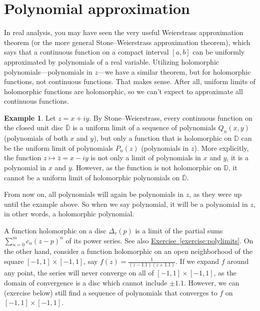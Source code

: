 \documentclass[12pt,openany]{book}
\newcommand{\D}{{\mathbb{D}}}
\theoremstyle{plain}
\theoremstyle{remark}
\theoremstyle{definition}
\theoremstyle{exercise}
\theoremstyle{example}
\newtheorem{example}[thm]{Example}
\newcommand{\exerciseref}[1]{\hyperref[#1]{Exercise~\ref*{#1}}}
\begin{document}

\section{Polynomial approximation}
\label{sec:polyapprox}

In real analysis, you may have seen the very useful
Weierstrass approximation theorem (or the more general
Stone--Weierstrass approximation theorem), which says that a continuous function
on a compact interval $[a,b]$ can be uniformly approximated by polynomials
of a real variable.  Utilizing holomorphic polynomials---polynomials in $z$---we have a
similar theorem, but for holomorphic functions, not
continuous functions.  That makes sense.  After all, uniform limits of
holomorphic functions are holomorphic, so we can't expect to approximate all
continuous functions.

\begin{example}
Let $z = x+iy$.
By Stone--Weierstrass,
every continuous function on the closed unit disc $\overline{\D}$
is a uniform limit of a sequence of polynomials
$Q_n(x,y)$ (polynomials of both $x$ and $y$), but only a function that is
holomorphic on $\D$ can be the uniform limit of polynomials
$P_n(z)$ (polynomials in $z$).
More explicitly, the function $z \mapsto \bar{z}=x-iy$ is not only a limit of
polynomials in $x$ and $y$, it is a polynomial in $x$ and $y$.  However, as
the function is not holomorphic on $\D$, it cannot be a
uniform limit of holomorphic polynomials on $\overline{\D}$.
\end{example}

From now on, all polynomials will again be polynomials in $z$, as they were
up until the example above.  So when we say polynomial, it will be
a polynomial in $z$, in other words, a holomorphic polynomial.

A function holomorphic on a disc $\Delta_r(p)$ is a limit of the partial sums
$\sum_{n=0}^m c_n {(z-p)}^n$
of its power series.  See also
\exerciseref{exercise:polylimits}.  On the other hand, consider a function 
holomorphic on an open neighborhood of the square $[-1,1] \times [-1,1]$, say
$f(z) = \frac{1}{(z-1.1)(z+1.1)}$.  If we expand $f$ around any point, the
series will never converge on all of $[-1,1] \times [-1,1]$, as the domain
of convergence is a disc which cannot include $\pm 1.1$.  However, we can
(exercise below) still find a sequence of polynomials that converges to $f$
on $[-1,1] \times [-1,1]$.
\end{document}
